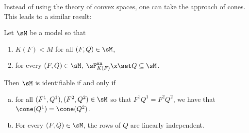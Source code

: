 \documentclass[12pt,a4paper]{article}
\begin{document}
Instead of using the theory of convex spaces, one can take the approach of cones. This leads to a similar result: 
\begin{theorem}
    Let $\sM$ be a model so that 
    \begin{enumerate}
        \item $K(F)<M$ for all $(F,Q)\in \sM$,
        \item for every $(F,Q)\in\sM$, $\sF_{K(F)}^{\text{an}}\x \set Q\subseteq \sM$. 
    \end{enumerate}
     Then $\sM$ is identifiable if and only if 
    \begin{enumerate}[(a)]
    \item for all $(F^1,Q^1),(F^2,Q^2)\in \sM$ so that $F^1Q^1=F^2Q^2$, we have that $\cone(Q^1)=\cone(Q^2)$. 
    \item For every $(F,Q)\in\sM$, the rows of $Q$ are linearly independent.     
    \end{enumerate}
\end{theorem}
\end{document}
